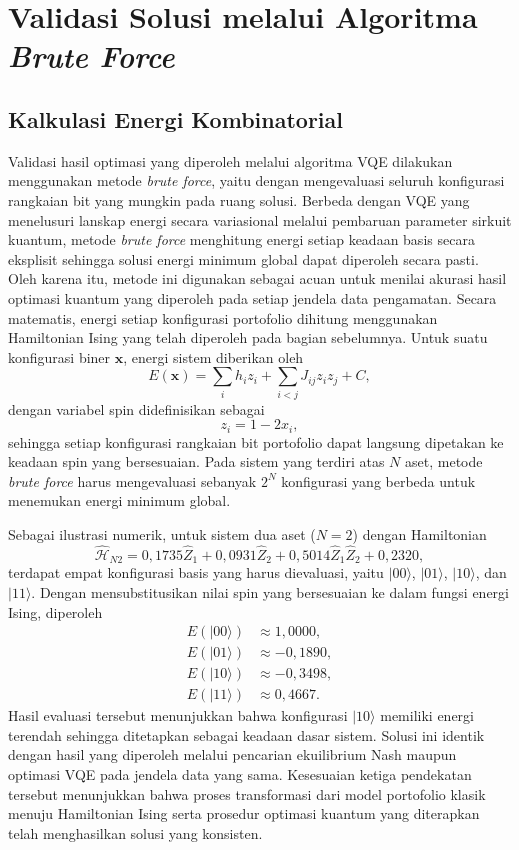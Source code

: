 \section{Validasi Solusi melalui Algoritma \textit{Brute Force}}
\label{sec:4_9_validasi_benchmark}

\subsection{Kalkulasi Energi Kombinatorial}
Validasi hasil optimasi yang diperoleh melalui algoritma VQE dilakukan menggunakan metode \textit{brute force}, yaitu dengan mengevaluasi seluruh konfigurasi rangkaian bit yang mungkin pada ruang solusi. Berbeda dengan VQE yang menelusuri lanskap energi secara variasional melalui pembaruan parameter sirkuit kuantum, metode \textit{brute force} menghitung energi setiap keadaan basis secara eksplisit sehingga solusi energi minimum global dapat diperoleh secara pasti. Oleh karena itu, metode ini digunakan sebagai acuan untuk menilai akurasi hasil optimasi kuantum yang diperoleh pada setiap jendela data pengamatan. Secara matematis, energi setiap konfigurasi portofolio dihitung menggunakan Hamiltonian Ising yang telah diperoleh pada bagian sebelumnya. Untuk suatu konfigurasi biner $\mathbf{x}$, energi sistem diberikan oleh
\begin{equation}
E(\mathbf{x})
=
\sum_i h_i z_i
+
\sum_{i<j} J_{ij} z_i z_j
+
C,
\end{equation}
dengan variabel spin didefinisikan sebagai
\begin{equation}
z_i = 1 - 2x_i,
\end{equation}
sehingga setiap konfigurasi rangkaian bit portofolio dapat langsung dipetakan ke keadaan spin yang bersesuaian. Pada sistem yang terdiri atas $N$ aset, metode \textit{brute force} harus mengevaluasi sebanyak $2^N$ konfigurasi yang berbeda untuk menemukan energi minimum global.

Sebagai ilustrasi numerik, untuk sistem dua aset ($N=2$) dengan Hamiltonian
\begin{equation}
\hat{\mathcal{H}}_{N2}
=
0,1735 \hat{Z}_1
+
0,0931 \hat{Z}_2
+
0,5014 \hat{Z}_1 \hat{Z}_2
+
0,2320,
\end{equation}
terdapat empat konfigurasi basis yang harus dievaluasi, yaitu $|00\rangle$, $|01\rangle$, $|10\rangle$, dan $|11\rangle$. Dengan mensubstitusikan nilai spin yang bersesuaian ke dalam fungsi energi Ising, diperoleh
\begin{align}
E(|00\rangle) &\approx 1,0000,\\
E(|01\rangle) &\approx -0,1890,\\
E(|10\rangle) &\approx -0,3498,\\
E(|11\rangle) &\approx 0,4667.
\end{align}
Hasil evaluasi tersebut menunjukkan bahwa konfigurasi $|10\rangle$ memiliki energi terendah sehingga ditetapkan sebagai keadaan dasar sistem. Solusi ini identik dengan hasil yang diperoleh melalui pencarian ekuilibrium Nash maupun optimasi VQE pada jendela data yang sama. Kesesuaian ketiga pendekatan tersebut menunjukkan bahwa proses transformasi dari model portofolio klasik menuju Hamiltonian Ising serta prosedur optimasi kuantum yang diterapkan telah menghasilkan solusi yang konsisten.

